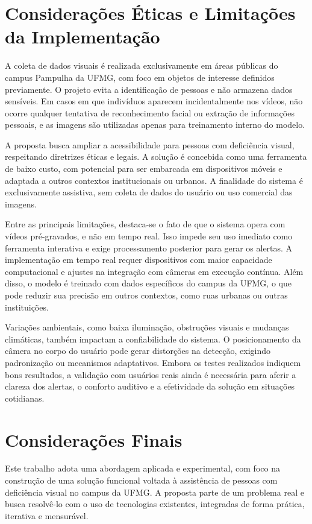 \section{\textbf{Considerações Éticas e Limitações da Implementação}}

A coleta de dados visuais é realizada exclusivamente em áreas públicas do campus Pampulha da UFMG, com foco em objetos de interesse definidos previamente. O projeto evita a identificação de pessoas e não armazena dados sensíveis. Em casos em que indivíduos aparecem incidentalmente nos vídeos, não ocorre qualquer tentativa de reconhecimento facial ou extração de informações pessoais, e as imagens são utilizadas apenas para treinamento interno do modelo.

A proposta busca ampliar a acessibilidade para pessoas com deficiência visual, respeitando diretrizes éticas e legais. A solução é concebida como uma ferramenta de baixo custo, com potencial para ser embarcada em dispositivos móveis e adaptada a outros contextos institucionais ou urbanos. A finalidade do sistema é exclusivamente assistiva, sem coleta de dados do usuário ou uso comercial das imagens.

Entre as principais limitações, destaca-se o fato de que o sistema opera com vídeos pré-gravados, e não em tempo real. Isso impede seu uso imediato como ferramenta interativa e exige processamento posterior para gerar os alertas. A implementação em tempo real requer dispositivos com maior capacidade computacional e ajustes na integração com câmeras em execução contínua. Além disso, o modelo é treinado com dados específicos do campus da UFMG, o que pode reduzir sua precisão em outros contextos, como ruas urbanas ou outras instituições.

Variações ambientais, como baixa iluminação, obstruções visuais e mudanças climáticas, também impactam a confiabilidade do sistema. O posicionamento da câmera no corpo do usuário pode gerar distorções na detecção, exigindo padronização ou mecanismos adaptativos. Embora os testes realizados indiquem bons resultados, a validação com usuários reais ainda é necessária para aferir a clareza dos alertas, o conforto auditivo e a efetividade da solução em situações cotidianas.

\section{\textbf{Considerações Finais}}

Este trabalho adota uma abordagem aplicada e experimental, com foco na construção de uma solução funcional voltada à assistência de pessoas com deficiência visual no campus da UFMG. A proposta parte de um problema real e busca resolvê-lo com o uso de tecnologias existentes, integradas de forma prática, iterativa e mensurável.

